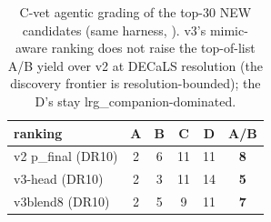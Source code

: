 \begin{table}[t]\centering
\caption{C-vet agentic grading of the top-30 NEW candidates (same harness, ). v3's mimic-aware ranking does not raise the top-of-list A/B yield over v2 at DECaLS resolution (the discovery frontier is resolution-bounded); the D's stay lrg\_companion-dominated.}
\label{tab:cvet}\small
\begin{tabular}{lccccc}
\toprule
ranking & A & B & C & D & A/B\\
\midrule
v2 p\_final (DR10) & 2 & 6 & 11 & 11 & \textbf{8}\\
v3-head (DR10) & 2 & 3 & 11 & 14 & \textbf{5}\\
v3blend8 (DR10) & 2 & 5 & 9 & 11 & \textbf{7}\\
\bottomrule
\end{tabular}
\end{table}
